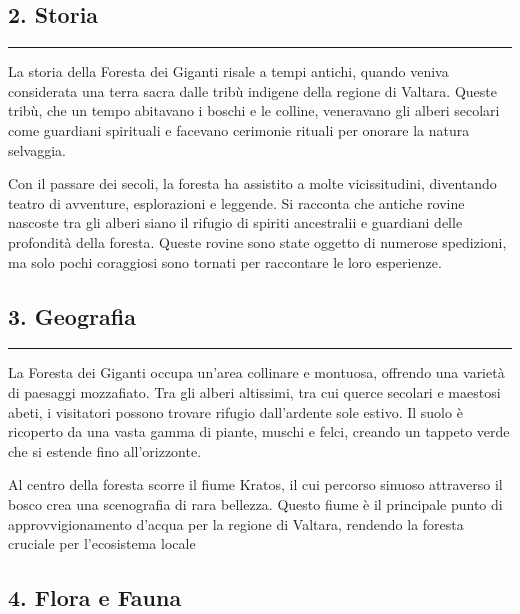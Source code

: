 \subsection{2. Storia}\label{storia}

\begin{center}\rule{0.5\linewidth}{0.5pt}\end{center}

La storia della Foresta dei Giganti risale a tempi antichi, quando
veniva considerata una terra sacra dalle tribù indigene della regione di
Valtara. Queste tribù, che un tempo abitavano i boschi e le colline,
veneravano gli alberi secolari come guardiani spirituali e facevano
cerimonie rituali per onorare la natura selvaggia.

Con il passare dei secoli, la foresta ha assistito a molte
vicissitudini, diventando teatro di avventure, esplorazioni e leggende.
Si racconta che antiche rovine nascoste tra gli alberi siano il rifugio
di spiriti ancestralii e guardiani delle profondità della foresta.
Queste rovine sono state oggetto di numerose spedizioni, ma solo pochi
coraggiosi sono tornati per raccontare le loro esperienze.

\subsection{3. Geografia}\label{geografia}

\begin{center}\rule{0.5\linewidth}{0.5pt}\end{center}

La Foresta dei Giganti occupa un'area collinare e montuosa, offrendo una
varietà di paesaggi mozzafiato. Tra gli alberi altissimi, tra cui querce
secolari e maestosi abeti, i visitatori possono trovare rifugio
dall'ardente sole estivo. Il suolo è ricoperto da una vasta gamma di
piante, muschi e felci, creando un tappeto verde che si estende fino
all'orizzonte.

Al centro della foresta scorre il fiume Kratos, il cui percorso sinuoso
attraverso il bosco crea una scenografia di rara bellezza. Questo fiume
è il principale punto di approvvigionamento d'acqua per la regione di
Valtara, rendendo la foresta cruciale per l'ecosistema locale

\subsection{4. Flora e Fauna}\label{flora-e-fauna}


